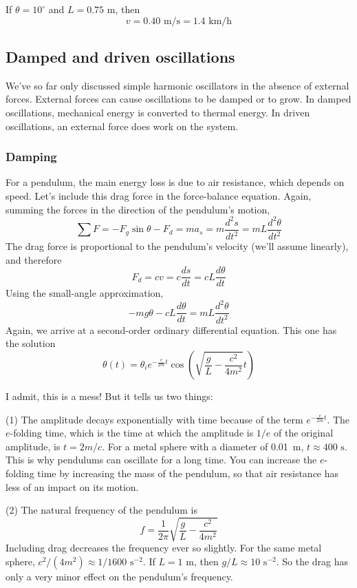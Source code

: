 If $\theta=10^{\circ}$ and $L=0.75\mbox{ m}$, then 
$$\boxed{v=0.40\mbox{ m/s}=1.4\mbox{ km/h}}$$


\subsection{Damped and driven oscillations}
We've so far only discussed simple harmonic oscillators in the absence of external forces. External forces can cause oscillations to be damped or to grow. In damped oscillations, mechanical energy is converted to thermal energy. In driven oscillations, an external force does work on the system.

\subsubsection{Damping}
For a pendulum, the main energy loss is due to air resistance, which depends on speed. Let's include this drag force in the force-balance equation. Again, summing the forces in the direction of the pendulum's motion,
$$\sum F=-F_g\sin\theta-F_d=ma_s=m\frac{d^2s}{dt^2}=mL\frac{d^2\theta}{dt^2}$$
The drag force is proportional to the pendulum's velocity (we'll assume linearly), and therefore
$$F_d=cv=c\frac{ds}{dt}=cL\frac{d\theta}{dt}$$
Using the small-angle approximation,
$$-mg\theta-cL\frac{d\theta}{dt}=mL\frac{d^2\theta}{dt^2}$$
Again, we arrive at a second-order ordinary differential equation. This one has the solution
$$\theta(t)=\theta_ie^{-\frac{c}{2m}t}\cos\left(\sqrt{\frac{g}{L}-\frac{c^2}{4m^2}}t\right)$$

I admit, this is a mess! But it tells us two things:

(1) The amplitude decays exponentially with time because of the term $e^{-\frac{c}{2m}t}$. The $e$-folding time, which is the time at which the amplitude is $1/e$ of the original amplitude, is $t=2m/c$. For a metal sphere with a diameter of 0.01~m, $t\approx 400\mbox{ s}$. This is why pendulums can oscillate for a long time. You can increase the $e$-folding time by increasing the mass of the pendulum, so that air resistance has less of an impact on its motion.

(2) The natural frequency of the pendulum is 
$$f=\frac{1}{2\pi}\sqrt{\frac{g}{L}-\frac{c^2}{4m^2}}$$
Including drag decreases the frequency ever so slightly. For the same metal sphere, $c^2/(4m^2)\approx 1/1600\mbox{ s}^{-2}$. If $L=1\mbox{ m}$, then $g/L\approx 10\mbox{ s}^{-2}$. So the drag has only a very minor effect on the pendulum's frequency.

